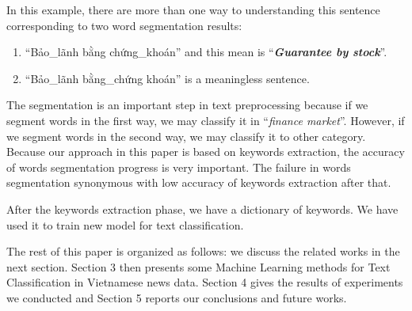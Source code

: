 \documentclass[conference]{IEEEtran}
\begin{document}
In this example, there are more than one way to understanding
this sentence corresponding to two word segmentation
results:
\begin{enumerate}
  \item \enquote{Bảo\_lãnh bằng chứng\_khoán} and this mean is \enquote{\textbf{\textit{Guarantee by stock}}}.
  \item \enquote{Bảo\_lãnh bằng\_chứng khoán} is a meaningless sentence.
\end{enumerate}

The segmentation is an important step in text preprocessing
because if we segment words in the first way, we may classify
it in \enquote{\textit{finance market}}. However, if we segment words in the
second way, we may classify it to other category. Because our
approach in this paper is based on keywords extraction, the
accuracy of words segmentation progress is very important.
The failure in words segmentation synonymous with low
accuracy of keywords extraction after that.

After the keywords extraction phase, we have a dictionary
of keywords. We have used it to train new model for text
classification.

The rest of this paper is organized as follows: we discuss
the related works in the next section. Section 3 then presents some Machine Learning methods for 
Text Classification in Vietnamese news data. Section 4 gives the results of experiments we
conducted and Section 5 reports our conclusions and future works.


%
%
\end{document}
